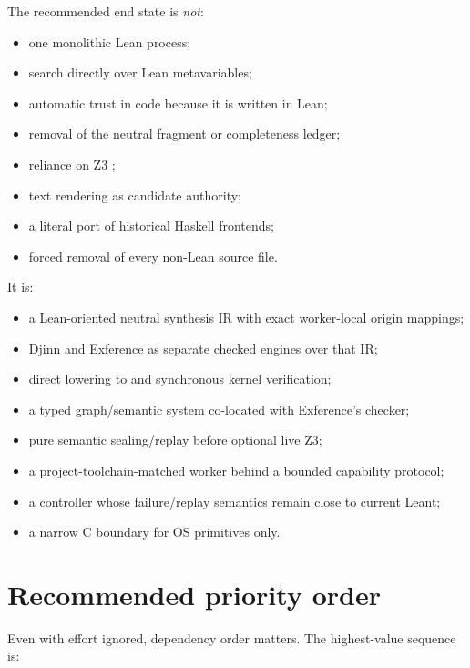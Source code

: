 \documentclass[10pt,letterpaper,oneside]{report}
\newcommand{\code}[1]{\texttt{\detokenize{#1}}}
\begin{document}
The recommended end state is \emph{not}:

\begin{itemize}
  \item one monolithic Lean process;
  \item search directly over Lean metavariables;
  \item automatic trust in code because it is written in Lean;
  \item removal of the neutral fragment or completeness ledger;
  \item reliance on Z3 \code{unsat};
  \item text rendering as candidate authority;
  \item a literal port of historical Haskell frontends;
  \item forced removal of every non-Lean source file.
\end{itemize}

It is:

\begin{itemize}
  \item a Lean-oriented neutral synthesis IR with exact worker-local origin mappings;
  \item Djinn and Exference as separate checked engines over that IR;
  \item direct lowering to \code{Expr} and synchronous kernel verification;
  \item a typed graph/semantic system co-located with Exference's checker;
  \item pure semantic sealing/replay before optional live Z3;
  \item a project-toolchain-matched worker behind a bounded capability protocol;
  \item a controller whose failure/replay semantics remain close to current Leant;
  \item a narrow C boundary for OS primitives only.
\end{itemize}

\section{Recommended priority order}

Even with effort ignored, dependency order matters. The highest-value sequence is:
\end{document}
